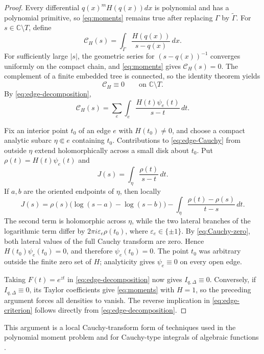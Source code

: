 \documentclass[11pt]{article}
\numberwithin{equation}{section}
\theoremstyle{definition}
\theoremstyle{remark}
\newcommand{\C}{\mathbb C}
\begin{document}
\begin{proof}
Every differential $q(x)^mH(q(x))dx$ is polynomial and has a polynomial
primitive, so \eqref{eq:moments} remains true after replacing $\Gamma$ by
$\widetilde\Gamma$.  For $s\in\C\setminus T$, define
\[
  \mathcal C_H(s)=
  \int_{\widetilde\Gamma}
  \frac{H(q(x))}{s-q(x)}\,dx.
\]
For sufficiently large $|s|$, the geometric series for
$(s-q(x))^{-1}$ converges uniformly on the compact chain, and
\eqref{eq:moments} gives $\mathcal C_H(s)=0$.  The complement of a finite
embedded tree is connected, so the identity theorem yields
\begin{equation}\label{eq:Cauchy-zero}
  \mathcal C_H\equiv0\qquad\text{on }\C\setminus T.
\end{equation}
By \eqref{eq:edge-decomposition},
\begin{equation}\label{eq:edge-Cauchy}
  \mathcal C_H(s)
  =\sum_e\int_e\frac{H(t)\psi_e(t)}{s-t}\,dt.
\end{equation}

Fix an interior point $t_0$ of an edge $e$ with $H(t_0)\ne0$, and choose
a compact analytic subarc $\eta\Subset e$ containing $t_0$.  Contributions
to \eqref{eq:edge-Cauchy} from outside $\eta$ extend holomorphically across
a small disk about $t_0$.  Put $\rho(t)=H(t)\psi_e(t)$ and
\[
  J(s)=\int_\eta\frac{\rho(t)}{s-t}\,dt.
\]
If $a,b$ are the oriented endpoints of $\eta$, then locally
\[
  J(s)=
  \rho(s)\bigl(\log(s-a)-\log(s-b)\bigr)
  -\int_\eta\frac{\rho(t)-\rho(s)}{t-s}\,dt.
\]
The second term is holomorphic across $\eta$, while the two lateral
branches of the logarithmic term differ by
$2\pi i\varepsilon_e\rho(t_0)$, where
$\varepsilon_e\in\{\pm1\}$.  By \eqref{eq:Cauchy-zero}, both lateral
values of the full Cauchy transform are zero.  Hence
$H(t_0)\psi_e(t_0)=0$, and therefore $\psi_e(t_0)=0$.  The point $t_0$ was
arbitrary outside the finite zero set of $H$; analyticity gives
$\psi_e\equiv0$ on every open edge.

Taking $F(t)=e^{zt}$ in \eqref{eq:edge-decomposition} now gives
$I_{q,\Delta}\equiv0$.  Conversely, if $I_{q,\Delta}\equiv0$, its Taylor
coefficients give \eqref{eq:moments} with $H=1$, so the preceding argument
forces all densities to vanish.  The reverse implication in
\eqref{eq:edge-criterion} follows directly from
\eqref{eq:edge-decomposition}.
\end{proof}

This argument is a local Cauchy-transform form of techniques used in the
polynomial moment problem and for Cauchy-type integrals of algebraic
functions \cite{PakovichMuzychuk,PakovichRoytvarfYomdin,GavrilovPakovich}.
\end{document}
